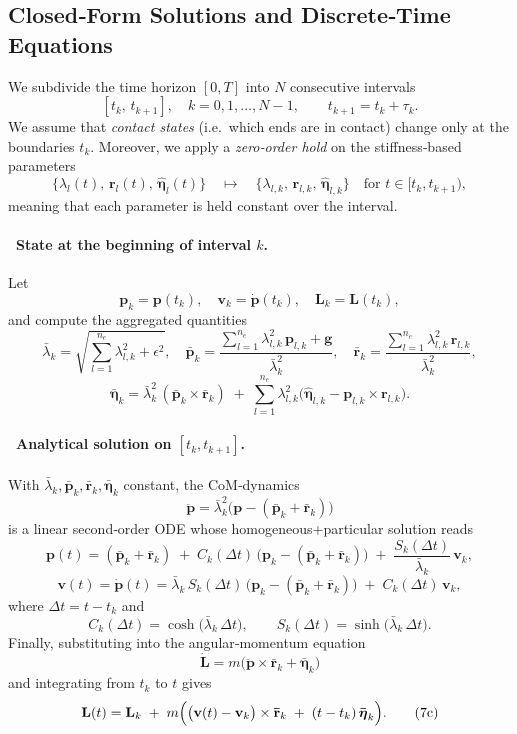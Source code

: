 \documentclass[main.tex]{subfiles}
\begin{document}
\begin{sloppypar}
\subsection{Closed‐Form Solutions and Discrete‐Time Equations}

We subdivide the time horizon $[0,T]$ into $N$ consecutive intervals
\[
[t_k,\,t_{k+1}],\quad k=0,1,\dots,N-1,\qquad
t_{k+1}=t_k+\tau_k.
\]
We assume that \emph{contact states} (i.e.\ which ends are in contact) change only at the boundaries $t_k$.  Moreover, we apply a \emph{zero‐order hold} on the stiffness‐based parameters
\[
\{\lambda_{l}(t),\,\mathbf{r}_{l}(t),\,\mathbf{\hat{\boldsymbol{\eta}}}_{l}(t)\}
\quad\mapsto\quad
\{\lambda_{l,k},\,\mathbf{r}_{l,k},\,\mathbf{\hat{\boldsymbol{\eta}}}_{l,k}\}
\quad\text{for }t\in[t_k,t_{k+1}),
\]
meaning that each parameter is held constant over the interval.

\medskip
\paragraph{\ State at the beginning of interval $k$.}
Let
\[
\mathbf{p}_k = \mathbf{p}(t_k),\quad
\mathbf{v}_k = \dot{\mathbf{p}}(t_k),\quad
\mathbf{L}_k = \mathbf{L}(t_k),
\]
and compute the aggregated quantities
\[
\bar\lambda_k
=\sqrt{\sum_{l=1}^{n_e}\lambda_{l,k}^2+\epsilon^2},\quad
\mathbf{\bar{p}}_k
=\frac{\sum_{l=1}^{n_e}\lambda_{l,k}^2\,\mathbf{p}_{l,k}+\mathbf{g}}{\bar\lambda_k^2},\quad
\mathbf{\bar{r}}_k
=\frac{\sum_{l=1}^{n_e}\lambda_{l,k}^2\,\mathbf{r}_{l,k}}{\bar\lambda_k^2},
\]
\[
\mathbf{\bar{\boldsymbol{\eta}}}_k
=\bar\lambda_k^2\,(\mathbf{\bar{p}}_k\times\mathbf{\bar{r}}_k)
\;+\;\sum_{l=1}^{n_e}\lambda_{l,k}^2\bigl(\mathbf{\hat{\boldsymbol{\eta}}}_{l,k}-\mathbf{p}_{l,k}\times \mathbf{r}_{l,k}\bigr).
\]

\paragraph{\ Analytical solution on $[t_k,t_{k+1}]$.}
With $\bar\lambda_k,\mathbf{\bar{p}}_k,\mathbf{\bar{r}}_k,\mathbf{\bar{\boldsymbol{\eta}}}_k$ constant, the CoM‐dynamics 
\[
\ddot{\mathbf{p}} = \bar\lambda_k^2\bigl(\mathbf{p} -(\mathbf{\bar{p}}_k+\mathbf{\bar{r}}_k)\bigr)
\]
is a linear second‐order ODE whose homogeneous+particular solution reads
\[
\mathbf{p}(t)
= (\mathbf{\bar{p}}_k+\mathbf{\bar{r}}_k)
\;+\;C_k(\Delta t)\,\bigl(\mathbf{p}_k -(\mathbf{\bar{p}}_k+\mathbf{\bar{r}}_k)\bigr)
\;+\;\frac{S_k(\Delta t)}{\bar\lambda_k}\,\mathbf{v}_k,
\tag{7a}
\]
\[
\mathbf{v}(t)
=\dot{\mathbf{p}}(t)
=\bar\lambda_k\,S_k(\Delta t)\,\bigl(\mathbf{p}_k -(\mathbf{\bar{p}}_k+\mathbf{\bar{r}}_k)\bigr)
\;+\;C_k(\Delta t)\,\mathbf{v}_k,
\tag{7b}
\]
where $\Delta t = t - t_k$ and
\[
C_k(\Delta t) = \cosh\bigl(\bar\lambda_k\,\Delta t\bigr),\qquad
S_k(\Delta t) = \sinh\bigl(\bar\lambda_k\,\Delta t\bigr).
\]
Finally, substituting into the angular‐momentum equation
\[
\dot{\mathbf{L}} = m\bigl(\ddot{\mathbf{p}}\times \mathbf{\bar{r}}_k + \mathbf{\bar{\boldsymbol{\eta}}}_k\bigr)
\]
and integrating from $t_k$ to $t$ gives
\[
\mathbf{L}(t)
= \mathbf{L}_k
\;+\;m\Bigl(\bigl(\mathbf{v}(t)-\mathbf{v}_k\bigr)\times \mathbf{\bar{r}}_k
   \;+\;(t-t_k)\,\mathbf{\bar{\boldsymbol{\eta}}}_k\Bigr).
\tag{7c}
\]


\end{sloppypar}
\end{document}
